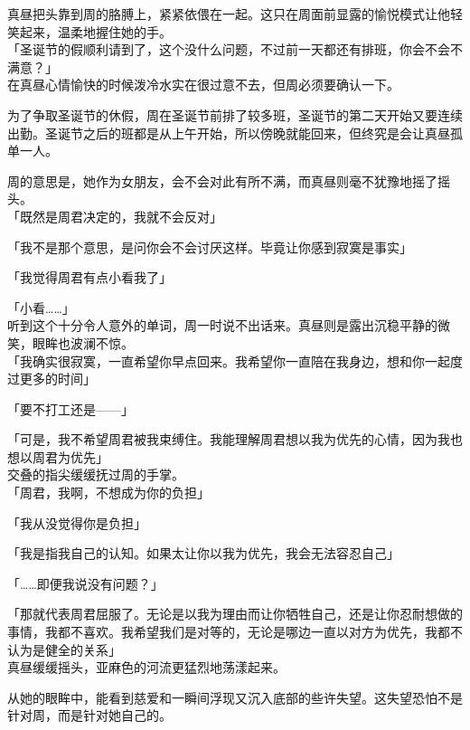 真昼把头靠到周的胳膊上，紧紧依偎在一起。这只在周面前显露的愉悦模式让他轻笑起来，温柔地握住她的手。\\

「圣诞节的假顺利请到了，这个没什么问题，不过前一天都还有排班，你会不会不满意？」\\

在真昼心情愉快的时候泼冷水实在很过意不去，但周必须要确认一下。

为了争取圣诞节的休假，周在圣诞节前排了较多班，圣诞节的第二天开始又要连续出勤。圣诞节之后的班都是从上午开始，所以傍晚就能回来，但终究是会让真昼孤单一人。

周的意思是，她作为女朋友，会不会对此有所不满，而真昼则毫不犹豫地摇了摇头。\\

「既然是周君决定的，我就不会反对」

「我不是那个意思，是问你会不会讨厌这样。毕竟让你感到寂寞是事实」

「我觉得周君有点小看我了」

「小看……」\\

听到这个十分令人意外的单词，周一时说不出话来。真昼则是露出沉稳平静的微笑，眼眸也波澜不惊。\\

「我确实很寂寞，一直希望你早点回来。我希望你一直陪在我身边，想和你一起度过更多的时间」

「要不打工还是——」

「可是，我不希望周君被我束缚住。我能理解周君想以我为优先的心情，因为我也想以周君为优先」\\

交叠的指尖缓缓抚过周的手掌。\\

「周君，我啊，不想成为你的负担」

「我从没觉得你是负担」

「我是指我自己的认知。如果太让你以我为优先，我会无法容忍自己」

「……即便我说没有问题？」

「那就代表周君屈服了。无论是以我为理由而让你牺牲自己，还是让你忍耐想做的事情，我都不喜欢。我希望我们是对等的，无论是哪边一直以对方为优先，我都不认为是健全的关系」\\

真昼缓缓摇头，亚麻色的河流更猛烈地荡漾起来。

从她的眼眸中，能看到慈爱和一瞬间浮现又沉入底部的些许失望。这失望恐怕不是针对周，而是针对她自己的。\\

